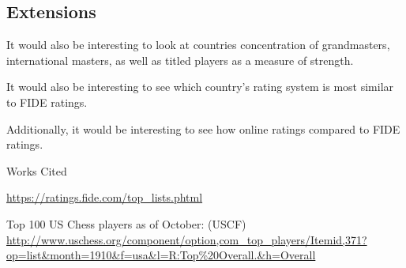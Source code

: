 \documentclass[12pt]{article}
\begin{document}
\subsection{Extensions}
It would also be interesting to look at countries concentration of grandmasters, international masters, as well as titled players as a measure of strength. 

It would also be interesting to see which country's rating system is most similar to FIDE ratings.

Additionally, it would be interesting to see how online ratings compared to FIDE ratings.

\newpage
\begin{center}
Works Cited
\end{center}


\url{https://ratings.fide.com/top_lists.phtml}


Top 100 US Chess players as of October: (USCF)
\url{http://www.uschess.org/component/option,com_top_players/Itemid,371?op=list&month=1910&f=usa&l=R:Top%20Overall.&h=Overall}
\end{document}
